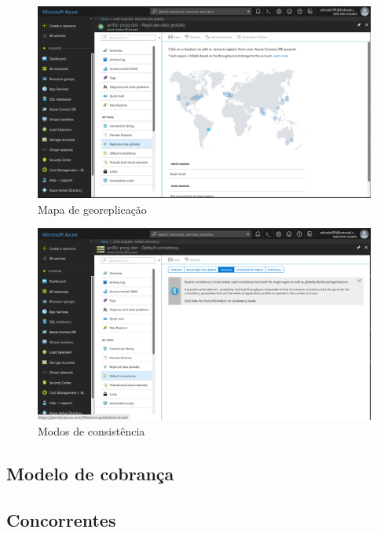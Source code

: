 \documentclass[12pt]{article}
\begin{document}
\begin{figure}[H]
	\label{fig:az4}
	\caption{Mapa de georeplicação}
	\includegraphics[scale=0.37]{img/az4.png}
	\centering
\end{figure}

\begin{figure}[H]
	\label{fig:az5}
	\caption{Modos de consistência}
	\includegraphics[scale=0.37]{img/az5.png}
	\centering
\end{figure}

\subsection{Modelo de cobrança}

\subsection{Concorrentes}


\end{document}
